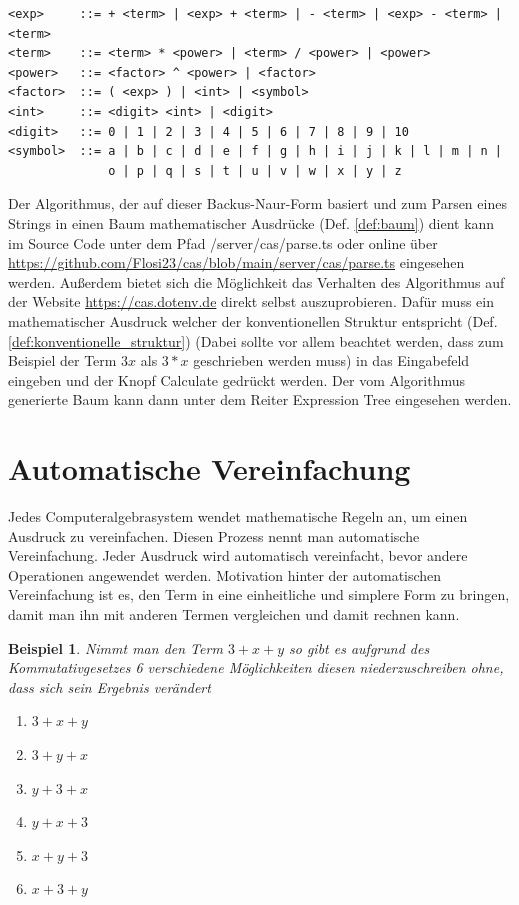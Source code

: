 \documentclass[11pt]{article}
\newcommand{\lab}[1]{(Def. \ref{#1})}
\newtheorem{example}{Beispiel}
\begin{document}
\begin{verbatim}
<exp>     ::= + <term> | <exp> + <term> | - <term> | <exp> - <term> | <term> 
<term>    ::= <term> * <power> | <term> / <power> | <power>
<power>   ::= <factor> ^ <power> | <factor>
<factor>  ::= ( <exp> ) | <int> | <symbol> 
<int>     ::= <digit> <int> | <digit>
<digit>   ::= 0 | 1 | 2 | 3 | 4 | 5 | 6 | 7 | 8 | 9 | 10
<symbol>  ::= a | b | c | d | e | f | g | h | i | j | k | l | m | n | 
              o | p | q | s | t | u | v | w | x | y | z
\end{verbatim}

Der Algorithmus, der auf dieser Backus-Naur-Form basiert und zum Parsen eines Strings in einen
Baum mathematischer Ausdrücke \lab{def:baum} dient kann im Source Code unter dem Pfad /server/cas/parse.ts 
oder online über \url{https://github.com/Flosi23/cas/blob/main/server/cas/parse.ts} eingesehen werden. \newline
Außerdem bietet sich die Möglichkeit das Verhalten des Algorithmus auf der Website  \url{https://cas.dotenv.de}
direkt selbst auszuprobieren. Dafür muss ein mathematischer Ausdruck welcher der konventionellen Struktur 
entspricht \lab{def:konventionelle_struktur}
(Dabei sollte vor allem beachtet werden, dass zum Beispiel der Term $3x$ als $3*x$ geschrieben werden muss)
in das Eingabefeld eingeben und der Knopf \glqq Calculate\grqq{}  gedrückt werden. 
Der vom Algorithmus generierte Baum kann dann unter dem Reiter \glqq Expression Tree\grqq{} eingesehen werden.

\section{Automatische Vereinfachung}

Jedes Computeralgebrasystem wendet mathematische Regeln an, um einen Ausdruck zu vereinfachen. 
Diesen Prozess nennt man automatische Vereinfachung. 
Jeder Ausdruck wird automatisch vereinfacht, bevor andere Operationen angewendet werden. 
Motivation hinter der automatischen Vereinfachung ist es, den Term in eine einheitliche und simplere Form zu bringen, 
damit man ihn mit anderen Termen vergleichen und damit rechnen kann. 

\begin{example}
Nimmt man den Term $3+x+y$ so gibt es aufgrund des Kommutativgesetzes 6 verschiedene Möglichkeiten diesen
niederzuschreiben ohne, dass sich sein Ergebnis verändert
\begin{enumerate}
  \item $3+x+y$
  \item $3+y+x$
  \item $y+3+x$
  \item $y+x+3$
  \item $x+y+3$
  \item $x+3+y$
\end{enumerate}
\end{example}
\end{document}
